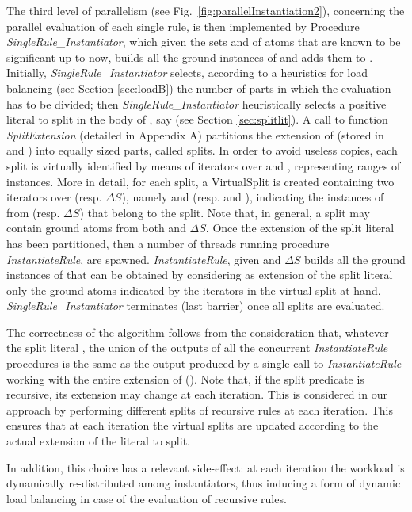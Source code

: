 \documentclass[preprint]{tlp}
\newcommand{\DNF}{\ensuremath{\Delta S}\xspace}
\begin{document}
The third level of parallelism (see Fig.~\ref{fig:parallelInstantiation2}), concerning the parallel evaluation
of each single rule, is then implemented by Procedure {\em SingleRule\_Instantiator},
which given the sets  and  of  atoms that are known to be significant up to now, builds all the
ground instances of  and adds them to .
Initially, {\em SingleRule\_Instantiator} selects, according to a
heuristics for load balancing (see Section \ref{sec:loadB}) the
number  of parts in which the evaluation has to be divided; then
{\em SingleRule\_Instantiator} heuristically selects a positive
literal to split in the body of , say  (see Section
\ref{sec:splitlit}). A call to function {\em SplitExtension}
(detailed in Appendix A) partitions the extension of  (stored in
 and ) into   equally sized parts, called splits. In
order to avoid useless copies, each split is virtually identified by
means of iterators over  and , representing ranges of
instances. More in detail, for each  split, a VirtualSplit is
created containing two iterators over  (resp. \DNF), namely
 and  (resp.  and ),
indicating the instances of  from  (resp. \DNF) that belong to
the split. Note that, in general, a split may contain ground atoms
from both  and \DNF. Once the extension of the split literal has
been partitioned, then a number of threads running procedure {\em
InstantiateRule}, are spawned. {\em InstantiateRule}, given  and
\DNF builds all the ground instances of  that can be obtained by
considering as extension of the split literal  only the ground
atoms indicated by the iterators in the virtual split at hand. {\em
SingleRule\_Instantiator} terminates (last barrier) once all splits
are evaluated.

The correctness of the algorithm follows from the consideration
that, whatever the split literal , the union of the outputs of
all the  concurrent {\em InstantiateRule} procedures is the same
as the output produced by a single call to {\em InstantiateRule}
working with the entire extension of  (). Note that, if the
split predicate is recursive, its extension may change at each
iteration. This is considered in our approach by performing
different splits of recursive rules at each iteration. This ensures
that at each iteration the virtual splits are updated according to
the actual extension of the literal to split.


In addition, this choice has a relevant side-effect: at each
iteration the workload is dynamically re-distributed among
instantiators, thus inducing a form of dynamic load balancing
in case of the evaluation of recursive rules.
\end{document}
